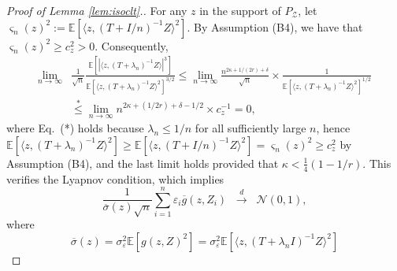 \documentclass[aos]{imsart}
\renewcommand{\bar}{\overline}
\newcommand{\pd}[1]{%
	{ \color{blue} PD: #1}%
}
\theoremstyle{plain}
\theoremstyle{definition}
\theoremstyle{definition}
\begin{document}
\begin{appendix}
\begin{proof}[Proof of Lemma \ref{lem:isoclt}.]
{For any $z$ in the support of $P_{\mathcal Z}$, let $\varsigma_n(z)^2 := \mathbb E[\langle z,(T+I/n)^{-1}Z\rangle^2]$.
By Assumption (B4), we have that $\varsigma_n(z)^2\geq c_z^2>0$. Consequently,
\begin{align*}
\lim_{n\to\infty}& \frac{1}{\sqrt{n}}\frac{\mathbb E[|\langle z, (T+\lambda_n)^{-1}Z\rangle|^3]}{\mathbb E[\langle z,(T+\lambda_n)^{-1}Z\rangle^2]^{3/2}} \leq 
\lim_{n\to\infty}\frac{n^{2\kappa+1/(2r)+\delta}}{\sqrt{n}} \times \frac{1}{\mathbb E[\langle z,(T+\lambda_n)^{-1}Z\rangle^2]^{1/2}}\\
&\overset{*}{\leq} \lim_{n\to\infty} n^{2\kappa+(1/2r)+\delta-1/2}\times c_z^{-1} = 0,
\end{align*}
where Eq.~(*) holds because $\lambda_n\leq 1/n$ for all sufficiently large $n$, hence $\mathbb E[\langle z,(T+\lambda_n)^{-1}Z\rangle^2] \geq \mathbb E[\langle z,(T+I/n)^{-1}Z\rangle^2] = \varsigma_n(z)^2\geq c_z^2$ by Assumption (B4),
and the last limit holds provided that $\kappa < \frac{1}{4}(1-1/r)$.
}
This verifies the Lyapnov condition, which implies 
\begin{equation}
\frac{1}{\bar\sigma(z)\sqrt{n}}\sum_{i=1}^n \varepsilon_i\bar g(z,Z_i) \;\;\overset{d}{\to}\;\;\mathcal N(0,1),
\label{eq:proof-isoclt-1}
\end{equation}
where
$$
\bar\sigma(z) =\sigma_\varepsilon^2\mathbb E[g(z,Z)^2]= \sigma_\varepsilon^2\mathbb E[\langle z, (T+\lambda_n I)^{-1}Z\rangle^2]
$$

%
%


\end{proof}
\end{appendix}
\end{document}
